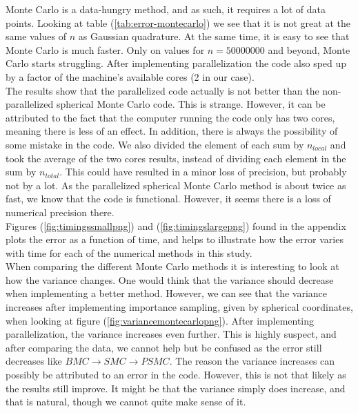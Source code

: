 \documentclass{article}
\begin{document}
Monte Carlo is a data-hungry method, and as such, it requires a lot of data points. Looking at table (\ref{tab:error-montecarlo}) we see that it is not great at the same values of $n$ as Gaussian quadrature. At the same time, it is easy to see that Monte Carlo is much faster. Only on values for $n=50000000$ and beyond, Monte Carlo starts struggling. After implementing parallelization the code also sped up by a factor of the machine's available cores (2 in our case). \\

The results show that the parallelized code actually is not better than the non-parallelized spherical Monte Carlo code. This is strange. However, it can be attributed to the fact that the computer running the code only has two cores, meaning there is less of an effect. In addition, there is always the possibility of some mistake in the code. We also divided the element of each sum by $n_{local}$ and took the average of the two cores results, instead of dividing each element in the sum by $n_{total}$.
This could have resulted in a minor loss of precision, but probably not by a lot. As the parallelized spherical Monte Carlo method is about twice as fast, we know that the code is functional. However, it seems there is a loss of numerical precision there. \\

Figures (\ref{fig:timingssmallpng}) and (\ref{fig:timingslargepng}) found in the appendix plots the error as a function of time, and helps to illustrate how the error varies with time for each of the numerical methods in this study. \\

When comparing the different Monte Carlo methods it is interesting to look at how the variance changes. One would think that the variance should decrease when implementing a better method. However, we can see that the variance increases after implementing importance sampling, given by spherical coordinates, when looking at figure (\ref{fig:variancemontecarlopng}). After implementing parallelization, the variance increases even further. This is highly suspect, and after comparing the data, we cannot help but be confused as the error still decreases like $BMC \to SMC \to PSMC$. The reason the variance increases can possibly be attributed to an error in the code. However, this is not that likely as the results still improve. It might be that the variance simply does increase, and that is natural, though we cannot quite make sense of it. \\
\end{document}
